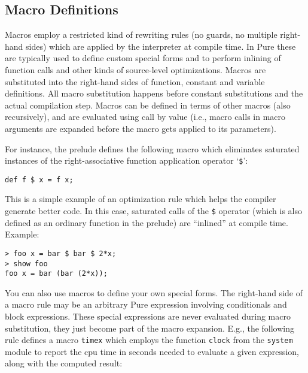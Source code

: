 \documentclass[a4paper,12pt]{article}
\begin{document}
\subsection{Macro Definitions}
\label{Macro Definitions}

Macros employ a restricted kind of rewriting rules (no guards, no multiple right-hand sides) which are applied by the interpreter at compile time. In Pure these are typically used to define custom special forms and to perform inlining of function calls and other kinds of source-level optimizations. Macros are substituted into the right-hand sides of function, constant and variable definitions. All macro substitution happens before constant substitutions and the actual compilation step. Macros can be defined in terms of other macros (also recursively), and are evaluated using call by value (i.e., macro calls in macro arguments are expanded before the macro gets applied to its parameters).

For instance, the prelude defines the following macro which eliminates saturated instances of the right-associative function application operator `\verb|$|':

\begin{lstlisting}
def f $ x = f x;
\end{lstlisting}

This is a simple example of an optimization rule which helps the compiler generate better code. In this case, saturated calls of the \verb|$| operator (which is also defined as an ordinary function in the prelude) are ``inlined'' at compile time. Example:

\begin{lstlisting}
> foo x = bar $ bar $ 2*x;
> show foo
foo x = bar (bar (2*x));
\end{lstlisting}

You can also use macros to define your own special forms. The right-hand side of a macro rule may be an arbitrary Pure expression involving conditionals and block expressions. These special expressions are never evaluated during macro substitution, they just become part of the macro expansion. E.g., the following rule defines a macro \verb|timex| which employs the function \verb|clock| from the \verb|system| module to report the cpu time in seconds needed to evaluate a given expression, along with the computed result:
\end{document}
